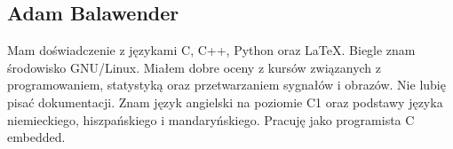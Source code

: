 \subsection{Adam Balawender}
Mam doświadczenie z językami C, C++, Python oraz LaTeX. Biegle znam środowisko GNU/Linux. Miałem dobre oceny z kursów związanych z programowaniem, statystyką oraz przetwarzaniem sygnałów i obrazów. Nie lubię pisać dokumentacji. Znam język angielski na poziomie C1 oraz podstawy języka niemieckiego, hiszpańskiego i mandaryńskiego. Pracuję jako programista C embedded.

